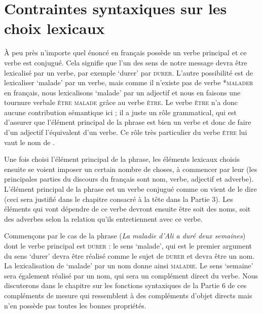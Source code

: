 \section{Contraintes syntaxiques sur les choix lexicaux}\label{sec:1.2.7}

À peu près n’importe quel énoncé en français possède un verbe principal et ce verbe est conjugué. Cela signifie que l’un des sens de notre message devra être lexicalisé par un verbe, par exemple ‘durer’ par \textsc{durer}. L’autre possibilité est de lexicaliser ‘malade’ par un verbe, mais comme il n’existe pas de verbe *\textsc{malader} en français, nous lexicalisons ‘malade’ par un adjectif et nous en faisons une tournure verbale \textsc{être} \textsc{malade} grâce au verbe \textsc{être}. Le verbe \textsc{être} n’a donc aucune contribution sémantique ici ; il a juste un rôle grammatical, qui est d’assurer que l’élément principal de la phrase est bien un verbe et donc de faire d’un adjectif l’équivalent d’un verbe. Ce rôle très particulier du verbe \textsc{être} lui vaut le nom de .

Une fois choisi l’élément principal de la phrase, les éléments lexicaux choisis ensuite se voient imposer un certain nombre de choses, à commencer par leur  (les principales parties du discours du français sont nom, verbe, adjectif et adverbe). L’élément principal de la phrase est un verbe conjugué comme on vient de le dire (ceci sera justifié dans le chapitre consacré à la tête dans la Partie 3). Les éléments qui vont dépendre de ce verbe devront ensuite être soit des noms, soit des adverbes selon la relation qu’ils entretiennent avec ce verbe.

Commençons par le cas de la phrase  (\textit{La maladie d’Ali a duré deux semaines}) dont le verbe principal est \textsc{durer} \textsc{:} le sens ‘malade’, qui est le premier argument du sens ‘durer’ devra être réalisé comme le sujet de \textsc{durer} et devra être un nom. La lexicalisation de ‘malade’ par un nom donne ainsi \textsc{maladie}. Le sens ‘semaine’ sera également réalisé par un nom, qui sera un complément direct du verbe. Nous discuterons dans le chapitre sur les fonctions syntaxiques de la Partie 6 de ces compléments de mesure qui ressemblent à des compléments d’objet directs mais n’en possède pas toutes les bonnes propriétés.

